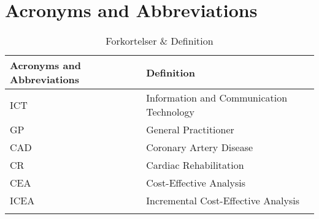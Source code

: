 \chapter{Acronyms and Abbreviations}


\begin{longtabu} to 
	\textbf{Acronyms and Abbreviations} & \textbf{Definition}\\[-1ex]
	\midrule
	ICT & Information and Communication Technology \\[-1ex]
	GP & General Practitioner \\[-1ex]
	CAD & Coronary Artery Disease \\[-1ex]
	CR & Cardiac Rehabilitation \\[-1ex]
	CEA & Cost-Effective Analysis \\[-1ex]
	ICEA & Incremental Cost-Effective Analysis \\[-1ex]
	\caption{Forkortelser \& Definition}
\end{longtabu}



